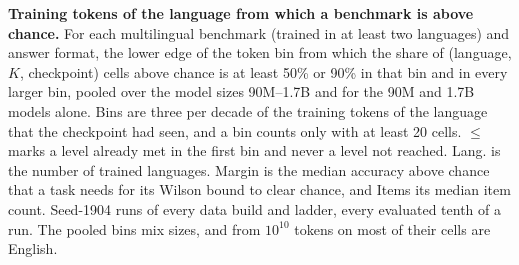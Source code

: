 \begin{table}[t]
\centering
\scriptsize

\caption{\textbf{Training tokens of the language from which a benchmark is above chance.} For each multilingual benchmark (trained in at least two languages) and answer format, the lower edge of the token bin from which the share of (language, $K$, checkpoint) cells above chance is at least 50\% or 90\% in that bin and in every larger bin, pooled over the model sizes 90M--1.7B and for the 90M and 1.7B models alone. Bins are three per decade of the training tokens of the language that the checkpoint had seen, and a bin counts only with at least 20 cells. $\leq$ marks a level already met in the first bin and never a level not reached. Lang. is the number of trained languages. Margin is the median accuracy above chance that a task needs for its Wilson bound to clear chance, and Items its median item count. Seed-1904 runs of every data build and ladder, every evaluated tenth of a run. The pooled bins mix sizes, and from $10^{10}$ tokens on most of their cells are English.}
\label{tab:rq0_thresholds}
\end{table}
